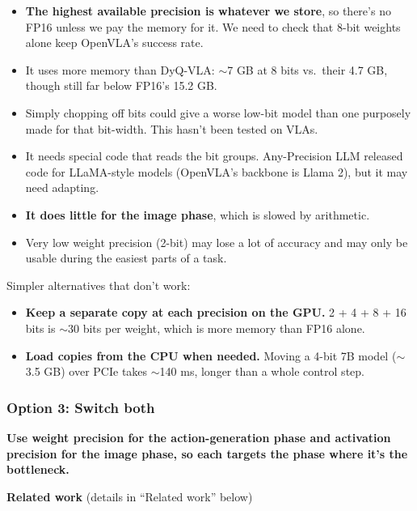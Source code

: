 \documentclass[11pt]{article}
\begin{document}
\begin{itemize}
\item \textbf{The highest available precision is whatever we store}, so there's no FP16 unless we pay the memory for it. We need to check that 8-bit weights alone keep OpenVLA's success rate.
\item It uses more memory than DyQ-VLA: $\sim$7 GB at 8 bits vs.~their 4.7 GB, though still far below FP16's 15.2 GB.
\item Simply chopping off bits could give a worse low-bit model than one purposely made for that bit-width. This hasn't been tested on VLAs.
\item It needs special code that reads the bit groups. Any-Precision LLM released code for LLaMA-style models (OpenVLA's backbone is Llama 2), but it may need adapting.
\item \textbf{It does little for the image phase}, which is slowed by arithmetic.
\item Very low weight precision (2-bit) may lose a lot of accuracy and may only be usable during the easiest parts of a task.
\end{itemize}

Simpler alternatives that don't work:

\begin{itemize}
\item \textbf{Keep a separate copy at each precision on the GPU.} 2 + 4 + 8 + 16 bits is $\sim$30 bits per weight, which is more memory than FP16 alone.
\item \textbf{Load copies from the CPU when needed.} Moving a 4-bit 7B model ($\sim$3.5 GB) over PCIe takes $\sim$140 ms, longer than a whole control step.
\end{itemize}

\subsubsection{Option 3: Switch both}\label{option-3-switch-both}

\textbf{Use weight precision for the action-generation phase and activation precision for the image phase, so each targets the phase where it's the bottleneck.}

\textbf{Related work} (details in ``Related work'' below)
\end{document}

